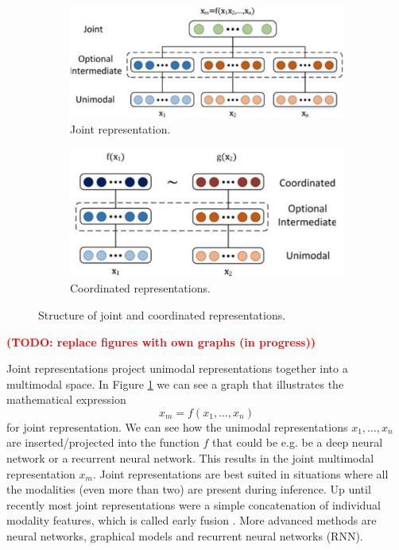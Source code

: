 \documentclass{article}
\newcommand{\todo}[1]{\textbf{\textcolor{Red}{(TODO: #1)}}}
\begin{document}
\begin{figure}[H]
	\centering
	\begin{subfigure}[b]{0.49\linewidth}
		\includegraphics[width=\linewidth]{joint_representations.png}
		\caption{Joint representation.}
		\label{fig:reps1}	
	\end{subfigure}
	\begin{subfigure}[b]{0.49\linewidth}
		\includegraphics[width=\linewidth]{coordinated_representations.png}
		\caption{Coordinated representations.}
		\label{fig:reps2}	
	\end{subfigure}
	\caption{Structure of joint and coordinated representations.}
	\label{fig:reps}
\end{figure}
\todo{replace figures with own graphs (in progress)}

Joint representations project unimodal representations together into a multimodal space. In Figure \ref{fig:reps1} we can see a graph that illustrates the mathematical expression
\begin{equation}
x_m = f(x_1, \dots , x_n)
\end{equation}
for joint representation. We can see how the unimodal representations $x_1, \dots , x_n$ are inserted/projected into the function $f$ that could be e.g. be a deep neural network or a recurrent neural network. This results in the joint multimodal representation $x_m$.
Joint representations are best suited in situations where all the modalities (even more than two) are present during inference. Up until recently most joint representations were a simple concatenation of individual modality features, which is called early fusion \citep{dmello2015review}. More advanced methods are neural networks, graphical models and recurrent neural networks (RNN).
\end{document}
